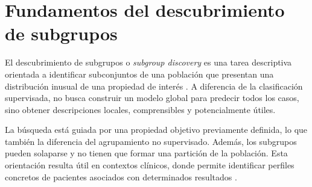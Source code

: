 


\section{Fundamentos del descubrimiento de subgrupos}
\label{sec:fundamentos_subgroup_discovery}

El descubrimiento de subgrupos o \textit{subgroup discovery} es una tarea descriptiva orientada a identificar subconjuntos de una población que presentan una distribución inusual de una propiedad de interés \cite{Herrera2011,Atzmueller2015}. A diferencia de la clasificación supervisada, no busca construir un modelo global para predecir todos los casos, sino obtener descripciones locales, comprensibles y potencialmente útiles.

La búsqueda está guiada por una propiedad objetivo previamente definida, lo que también la diferencia del agrupamiento no supervisado. Además, los subgrupos pueden solaparse y no tienen que formar una partición de la población. Esta orientación resulta útil en contextos clínicos, donde permite identificar perfiles concretos de pacientes asociados con determinados resultados \cite{Gamberger2002,Esnault2020}.

